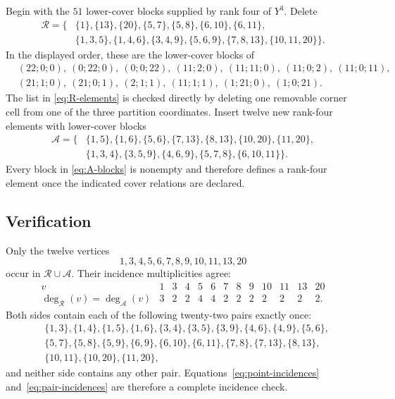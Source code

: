 \documentclass[11pt,a4paper]{amsart}
\theoremstyle{definition}
\theoremstyle{remark}
\newcommand{\Rcal}{\mathcal{R}}
\newcommand{\Acal}{\mathcal{A}}
\begin{document}
Begin with the $51$ lower-cover blocks supplied by rank four of $Y^3$. Delete
\begin{equation}\label{eq:R-blocks}
\begin{aligned}
\Rcal=\{&\{1\},\{13\},\{20\},\{5,7\},\{5,8\},\{6,10\},\{6,11\},\\
&\{1,3,5\},\{1,4,6\},\{3,4,9\},\{5,6,9\},\{7,8,13\},\{10,11,20\}\}.
\end{aligned}
\end{equation}
In the displayed order, these are the lower-cover blocks of
\begin{equation}\label{eq:R-elements}
\begin{aligned}
 &(22;0;0),\ (0;22;0),\ (0;0;22),\ (11;2;0),\ (11;11;0),\ (11;0;2),\ (11;0;11),\\
 &(21;1;0),\ (21;0;1),\ (2;1;1),\ (11;1;1),\ (1;21;0),\ (1;0;21).
\end{aligned}
\end{equation}
The list in \eqref{eq:R-elements} is checked directly by deleting one removable corner cell from one of the three partition coordinates.
Insert twelve new rank-four elements with lower-cover blocks
\begin{equation}\label{eq:A-blocks}
\begin{aligned}
\Acal=\{&\{1,5\},\{1,6\},\{5,6\},\{7,13\},\{8,13\},\{10,20\},\{11,20\},\\
&\{1,3,4\},\{3,5,9\},\{4,6,9\},\{5,7,8\},\{6,10,11\}\}.
\end{aligned}
\end{equation}
Every block in \eqref{eq:A-blocks} is nonempty and therefore defines a rank-four element once the indicated cover relations are declared.

\subsection{Verification}

Only the twelve vertices
\[
  1,3,4,5,6,7,8,9,10,11,13,20
\]
occur in $\Rcal\cup\Acal$. Their incidence multiplicities agree:
\begin{equation}\label{eq:point-incidences}
\begin{array}{c|rrrrrrrrrrrr}
 v&1&3&4&5&6&7&8&9&10&11&13&20\\
\hline
 \deg_{\Rcal}(v)=\deg_{\Acal}(v)&3&2&2&4&4&2&2&2&2&2&2&2.
\end{array}
\end{equation}
Both sides contain each of the following twenty-two pairs exactly once:
\begin{equation}\label{eq:pair-incidences}
\begin{aligned}
&\{1,3\},\{1,4\},\{1,5\},\{1,6\},\{3,4\},\{3,5\},\{3,9\},\{4,6\},\{4,9\},\{5,6\},\\
&\{5,7\},\{5,8\},\{5,9\},\{6,9\},\{6,10\},\{6,11\},\{7,8\},\{7,13\},\{8,13\},\\
&\{10,11\},\{10,20\},\{11,20\},
\end{aligned}
\end{equation}
and neither side contains any other pair. Equations~\eqref{eq:point-incidences} and~\eqref{eq:pair-incidences} are therefore a complete incidence check.
\end{document}
